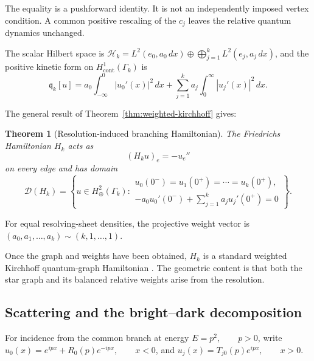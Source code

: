 \documentclass[11pt]{article}
\theoremstyle{plain}
\newtheorem{theorem}{Theorem}[section]
\theoremstyle{definition}
\begin{document}
The equality is a pushforward identity. It is not an independently imposed
vertex condition. A common positive rescaling of the \(c_j\) leaves the
relative quantum dynamics unchanged.

The scalar Hilbert space is
\(\mathcal H_k = L^2(e_0,a_0\,dx) \oplus \bigoplus_{j=1}^{k} L^2(e_j,a_j\,dx)\),
and the positive kinetic form on
\(H^1_{\mathrm{cont}}(\Gamma_k)\) is
\[
  \mathfrak q_k[u]
  =
  a_0
  \int_{-\infty}^{0}|u_0'(x)|^2\,dx
  +
  \sum_{j=1}^{k}
  a_j
  \int_0^\infty|u_j'(x)|^2\,dx.
\]

The general result of
Theorem~\ref{thm:weighted-kirchhoff} gives:

\begin{theorem}[Resolution-induced branching Hamiltonian]
\label{thm:Bk-canonical-Hamiltonian}
The Friedrichs Hamiltonian \(H_k\) acts as
\[
  (H_ku)_e=-u_e''
\]
on every edge and has domain
\[
  \mathcal D(H_k)
  =
  \left\{
    u\in H^2_\oplus(\Gamma_k):
    \begin{array}{l}
      u_0(0^-)
      =
      u_1(0^+)
      =
      \cdots
      =
      u_k(0^+),\\[2mm]
      \displaystyle
      -a_0u_0'(0^-)
      +
      \sum_{j=1}^{k}a_ju_j'(0^+)
      =
      0
    \end{array}
  \right\}.
\]
\end{theorem}

For equal resolving-sheet densities, the projective weight vector is
\((a_0,a_1,\ldots,a_k) \sim (k,1,\ldots,1)\).

Once the graph and weights have been obtained, \(H_k\) is a standard
weighted Kirchhoff quantum-graph Hamiltonian
\citep{ExnerSeba89,KostrykinSchrader99,BerkolaikoKuchment2013}.
The geometric content is that both the star graph and its balanced relative
weights arise from the resolution.

\subsection{Scattering and the bright--dark decomposition}
\label{subsec:Bk-forward-scattering}
\label{subsec:Bk-S-matrix}
\label{subsec:Bk-bright-dark}
\label{subsec:Bk-reverse-scattering}

For incidence from the common branch at energy
\(E=p^2, \qquad p>0\),
write
\(u_0(x) = e^{ipx} + R_0(p)e^{-ipx}, \qquad x<0\),
and
\(u_j(x) = T_{j0}(p)e^{ipx}, \qquad x>0\).
\end{document}
